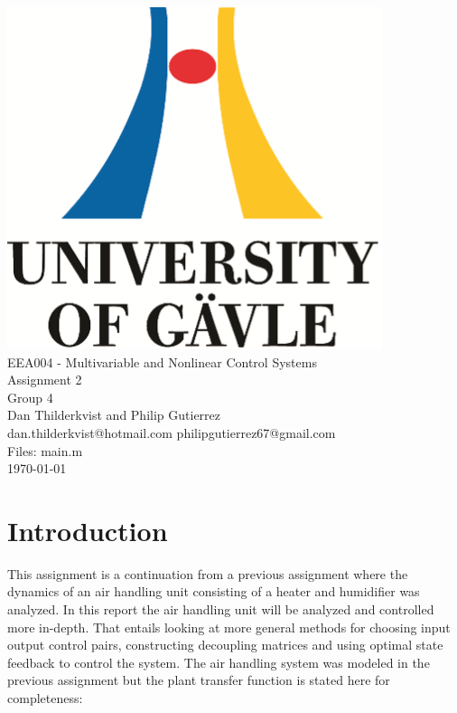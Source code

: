 \documentclass[a4paper, titlepage]{article}
\begin{document}
\begin{titlepage}
  \begin{center}
    \vspace*{1cm}
    \includegraphics[scale=1.0]{../figures/hig_logo_eng.png}\\
    \vspace{1.5cm}
    \large EEA004 - Multivariable and Nonlinear Control Systems\\
    \large Assignment 2\\
    \vspace{1.5cm}
    Group 4\\
    Dan Thilderkvist and Philip Gutierrez\\
    dan.thilderkvist@hotmail.com philipgutierrez67@gmail.com\\
    Files: main.m\\
    
    \vspace{1cm}
    \today
  \end{center}
\end{titlepage}

\tableofcontents
\clearpage

\section{Introduction}
This assignment is a continuation from a previous assignment where the dynamics of an air handling unit consisting of a heater and humidifier was analyzed.
In this report the air handling unit will be analyzed and controlled more in-depth.
That entails looking at more general methods for choosing input output control pairs, constructing decoupling matrices and using optimal state feedback to control the system.
The air handling system was modeled in the previous assignment but the plant transfer function is stated here for completeness:
\end{document}
